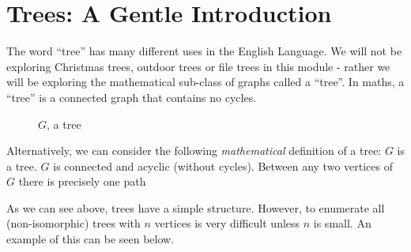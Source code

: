 
\section{Trees: A Gentle Introduction}

The word ``tree'' has many different uses in the English Language. We will not be exploring Christmas trees, outdoor trees or file trees in this module - rather we will be exploring the mathematical sub-class of graphs called a ``tree''. In maths, a ``tree'' is a connected graph that contains no cycles.

\begin{minipage}{0.5\textwidth}
    \begin{figure}[H]
        \centering
        \caption{$G$, a tree}
    \end{figure}
\end{minipage} \hfill
\begin{minipage}{0.45\textwidth}
Alternatively, we can consider the following \textit{mathematical} definition of a tree: $G$ is a tree. $G$ is connected and acyclic (without cycles). Between any two vertices of $G$ there is precisely one path
\end{minipage}\vspace{0.5em}

As we can see above, trees have a simple structure. However, to enumerate all (non-isomorphic) trees with $n$ vertices is very difficult unless $n$ is small. An example of this can be seen below.

